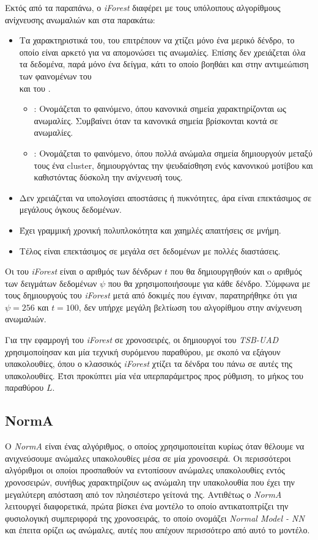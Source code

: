 Εκτός από τα παραπάνω, ο \emph{iForest} διαφέρει με τους υπόλοιπους αλγορίθμους ανίχνευσης ανωμαλιών και στα παρακάτω:
\begin{itemize}
    \item Τα χαρακτηριστικά του, του επιτρέπουν να χτίζει μόνο ένα μερικό δένδρο, το οποίο είναι αρκετό για να απομονώσει τις ανωμαλίες. Επίσης δεν χρειάζεται όλα τα δεδομένα, παρά μόνο ένα δείγμα, κάτι το οποίο βοηθάει και στην αντιμεώπιση των φαινομένων του \\ \emph{} και του \emph{}.
    \begin{itemize}
        \item \emph{}: Ονομάζεται το φαινόμενο, όπου κανονικά σημεία χαρακτηρίζονται ως ανωμαλίες. Συμβαίνει όταν τα κανονικά σημεία βρίσκονται κοντά σε ανωμαλίες.
        \item \emph{}: Ονομάζεται το φαινόμενο, όπου πολλά ανώμαλα σημεία δημιουργούν μεταξύ τους ένα cluster, δημιουργόντας την ψευδαίσθηση ενός κανονικού μοτίβου και καθιστόντας δύσκολη την ανίχνευσή τους.
    \end{itemize}
    \item Δεν χρειάζεται να υπολογίσει αποστάσεις ή πυκνότητες, άρα είναι επεκτάσιμος σε μεγάλους όγκους δεδομένων.
    \item Έχει γραμμική χρονική πολυπλοκότητα και χαημλές απαιτήσεις σε μνήμη.
    \item Τέλος είναι επεκτάσιμος σε μεγάλα σετ δεδομένων με πολλές διαστάσεις. 
\end{itemize}

Οι \emph{} του \emph{iForest} είναι ο αριθμός των δένδρων $t$ που θα δημιουργηθούν και o αριθμός των δειγμάτων δεδομένων $\psi$ που θα χρησιμοποιήσουμε για κάθε δένδρο. Σύμφωνα με τους δημιουργούς του \emph{iForest} \cite{liu2008isolation} μετά από δοκιμές που έγιναν, παρατηρήθηκε ότι για $\psi=256$ και $t=100$, δεν υπήρχε μεγάλη βελτίωση του αλγορίθμου στην ανίχνευση ανωμαλιών.

Για την εφαμρογή του \emph{iForest} σε χρονοσειρές, οι δημιουργοί του \emph{TSB-UAD} \cite{paparrizos2022tsb} χρησιμοποίησαν και μία τεχνική συρόμενου παραθύρου, με σκοπό να εξάγουν υπακολουθίες, όπου ο κλασσικός \emph{iForest} χτίζει τα δένδρα του πάνω σε αυτές της υπακολουθίες. Έτσι προκύπτει μία νέα υπερπαράμετρος προς ρύθμιση, το μήκος του παραθύρου $L$.

\subsection{NormA}
Ο \emph{NormA}\cite{boniol2021unsupervised} είναι ένας αλγόριθμος, ο οποίος χρησιμοποιείται κυρίως όταν θέλουμε να ανιχνεύσουμε ανώμαλες υπακολουθίες μέσα σε μία χρονοσειρά. Οι περισσότεροι αλγόριθμοι οι οποίοι προσπαθούν να εντοπίσουν ανώμαλες υπακολουθίες εντός χρονοσειρών, συνήθως χαρακτηρίζουν ως ανώμαλη την υπακολουθία που έχει την μεγαλύτερη απόσταση από τον πλησιέστερο γείτονά της. Αντιθέτως ο \emph{NormA} λειτουργεί διαφορετικά, πρώτα βίσκει ένα μοντέλο το οποίο αντικατοπτρίζει την φυσιολογική συμπεριφορά της χρονοσειράς, το οποίο ονομάζει \emph{Normal Model - NN} και έπειτα ορίζει ως ανώμαλες, αυτές που απέχουν περισσότερο από αυτό το μοντέλο.

